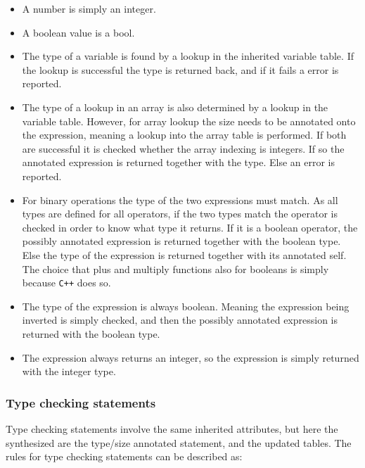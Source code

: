 \begin{itemize}
    \item A number is simply an integer.

    \item A boolean value is a bool.

    \item The type of a variable is found by a lookup in the inherited variable table.
          If the lookup is successful the type is returned back, and if it fails a error
          is reported.

    \item The type of a lookup in an array is also determined by a lookup in the variable table.
          However, for array lookup the size needs to be annotated onto the expression, meaning
          a lookup into the array table is performed. If both are successful it is checked
          whether the array indexing is integers. If so the annotated
          expression is returned together with the type. Else an error is reported.

    \item For binary operations the type of the two expressions must match. As all types
          are defined for all operators, if the two types match the operator is checked in order
          to know what type it returns. If it is a boolean operator, the possibly annotated
          expression is returned together with the boolean type. Else the type of the expression
          is returned together with its annotated self. The choice that plus and multiply
          functions also for booleans is simply because \texttt{C++} does so.
        
    \item The type of the  expression is always boolean. Meaning the expression
          being inverted is simply checked, and then the possibly annotated expression is
          returned with the boolean type.

    \item The  expression always returns an integer, so the expression is simply
          returned with the integer type.
\end{itemize}

\subsubsection{Type checking statements}
Type checking statements involve the same inherited attributes, but here the synthesized are
the type/size annotated statement, and the updated tables.
The rules for type checking statements can be described as:

